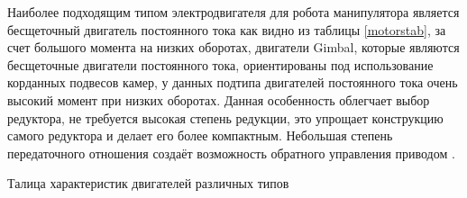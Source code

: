 Наиболее подходящим типом электродвигателя для робота манипулятора является бесщеточный двигатель постоянного тока как видно из таблицы \ref{motorstab}, за счет большого момента на низких оборотах, двигатели Gimbal, которые являются бесщеточные двигатели постоянного тока, ориентированы под использование корданных подвесов камер, у данных подтипа двигателей постоянного тока очень высокий момент при низких оборотах. Данная особенность облегчает выбор редуктора, не требуется высокая степень редукции, это упрощает конструкцию самого редуктора и делает его более компактным. Небольшая степень передаточного отношения создаёт возможность обратного управления приводом \citep{8867893}.

\begin{table}[H]
	\centering
	\caption{Талица характеристик двигателей различных типов}\label{motorstab}
	\begin{adjustbox}{width={\textwidth}}


\end{adjustbox}
\end{table}
